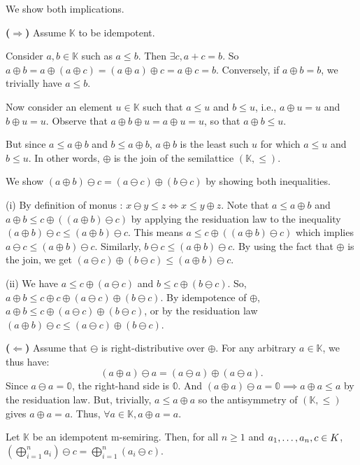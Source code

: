 \begin{appendixproof}
  We show both implications.

  \textbf{($\Rightarrow$)}
  Assume $\mathbb K$ to be idempotent.

  Consider $a,b \in\mathbb K$ such as $a\leq b$. Then $\exists c, a+c=b$.
  So $a \oplus b = a \oplus (a \oplus c)=(a\oplus a)\oplus c=a \oplus c = b$.
  Conversely, if $a\oplus b = b$, we trivially have $a\leq b$.

  Now consider an element $u\in\mathbb K$ such that $a \leq u$ and $b
  \leq u$, i.e.,
  $a \oplus u = u$ and $b\oplus u =u$. Observe that $a\oplus b\oplus
  u=a\oplus u=u$, so that $a\oplus b\leq u$.

  But since $a\leq a \oplus b$ and $b \leq a \oplus b$,
  $a \oplus b $ is the least such $u$ for which $a\leq u $ and $b \leq u$.
  In other words, $\oplus$ is the join of the semilattice $(\mathbb K,\leq)$.

  \medskip
  We show $(a\oplus b)\ominus c=(a\ominus c)\oplus (b\ominus c)$ by
  showing both inequalities.

  (i) By definition of monus : $x \ominus y \leq z \iff x \leq y \oplus
  z$. Note that $a\leq a\oplus b$ and $a\oplus b\leq c \oplus ((a\oplus
  b)\ominus c)$ by applying the residuation law to the inequality
  $(a\oplus b)\ominus c\leq (a\oplus b)\ominus c$. This means $a\leq
  c\oplus((a\oplus b)\ominus c)$ which implies $a\ominus c\leq (a\oplus b)\ominus c$.
  Similarly, $b\ominus c\leq (a\oplus b)\ominus c$. By using the fact
  that $\oplus$ is the join, we get
  $(a\ominus c)\oplus (b\ominus c) \leq (a\oplus b) \ominus c$.

  (ii) We have $a\leq c \oplus (a\ominus c)$ and $b\leq c\oplus (b\ominus c)$. So, $a\oplus b \leq c\oplus c \oplus (a\ominus c) \oplus (b\ominus c)$.
  By idempotence of $\oplus$,  $a\oplus b \leq c \oplus (a\ominus c)
  \oplus (b\ominus c)$, or by the residuation law
$(a\oplus b) \ominus c \leq (a\ominus c)\oplus (b\ominus c) $.

\bigskip
\textbf{($\Leftarrow$)}
  Assume that $\ominus$ is right-distributive over $\oplus$.
For any arbitrary $a\in \mathbb K$, we thus have:
\[
  (a\oplus a)\ominus a
  = (a\ominus a)\oplus(a\ominus a).
\]
Since $a\ominus a=\mathbb 0$, the right-hand side is $\mathbb 0$. And
$(a\oplus a)\ominus a = \mathbb 0\implies a\oplus a\leq a$ by the
residuation law.
  But, trivially, $a\le a\oplus a$ so the antisymmetry of $(\mathbb K,\leq)$ gives $a\oplus a=a$.
  Thus, \(\forall a\in\mathbb K, a \oplus a=a.\)
\end{appendixproof}
\begin{corollaryrep}\label{lem:finite-add-monus}
Let \(\mathbb K\) be an
idempotent
m-semiring.
Then, for all $n \ge 1$ and $a_1,\dots,a_n,c \in\nobreak K$,
\(
\left(\bigoplus_{i=1}^n a_i\right)\ominus c
=
\bigoplus_{i=1}^n (a_i \ominus c).
\)
\end{corollaryrep}

